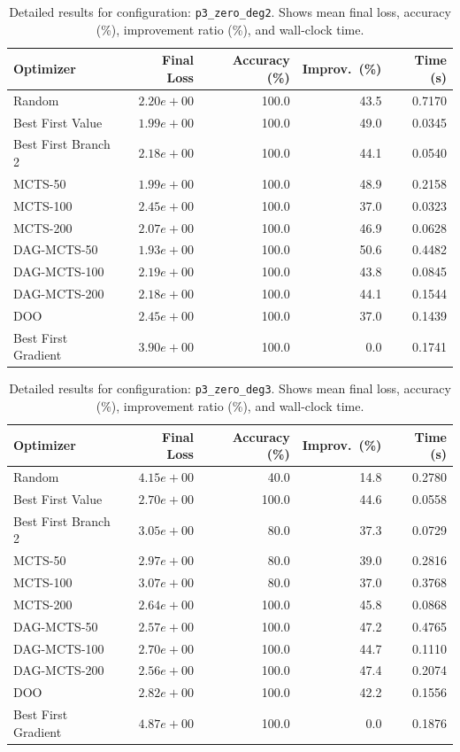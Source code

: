 \begin{table}[H]
\centering
\caption{Detailed results for configuration: \texttt{p3\_zero\_deg2}. Shows mean final loss, accuracy (\%), improvement ratio (\%), and wall-clock time.}
\label{tab:funclearn-detail-10}
\begin{tabular}{lrrrr}
\toprule
Optimizer & Final Loss & Accuracy (\%) & Improv.~(\%) & Time (s) \\
\midrule
Random & $2.20e+00$ & 100.0 & 43.5 & 0.7170 \\
\hline
Best First Value & $1.99e+00$ & 100.0 & 49.0 & 0.0345 \\
\hline
Best First Branch 2 & $2.18e+00$ & 100.0 & 44.1 & 0.0540 \\
\hline
MCTS-50 & $1.99e+00$ & 100.0 & 48.9 & 0.2158 \\
\hline
MCTS-100 & $2.45e+00$ & 100.0 & 37.0 & 0.0323 \\
\hline
MCTS-200 & $2.07e+00$ & 100.0 & 46.9 & 0.0628 \\
\hline
DAG-MCTS-50 & \textbf{$1.93e+00$} & 100.0 & 50.6 & 0.4482 \\
\hline
DAG-MCTS-100 & $2.19e+00$ & 100.0 & 43.8 & 0.0845 \\
\hline
DAG-MCTS-200 & $2.18e+00$ & 100.0 & 44.1 & 0.1544 \\
\hline
DOO & $2.45e+00$ & 100.0 & 37.0 & 0.1439 \\
\hline
Best First Gradient & $3.90e+00$ & 100.0 & 0.0 & 0.1741 \\
\bottomrule
\end{tabular}
\end{table}

\begin{table}[H]
\centering
\caption{Detailed results for configuration: \texttt{p3\_zero\_deg3}. Shows mean final loss, accuracy (\%), improvement ratio (\%), and wall-clock time.}
\label{tab:funclearn-detail-11}
\begin{tabular}{lrrrr}
\toprule
Optimizer & Final Loss & Accuracy (\%) & Improv.~(\%) & Time (s) \\
\midrule
Random & $4.15e+00$ & 40.0 & 14.8 & 0.2780 \\
\hline
Best First Value & $2.70e+00$ & 100.0 & 44.6 & 0.0558 \\
\hline
Best First Branch 2 & $3.05e+00$ & 80.0 & 37.3 & 0.0729 \\
\hline
MCTS-50 & $2.97e+00$ & 80.0 & 39.0 & 0.2816 \\
\hline
MCTS-100 & $3.07e+00$ & 80.0 & 37.0 & 0.3768 \\
\hline
MCTS-200 & $2.64e+00$ & 100.0 & 45.8 & 0.0868 \\
\hline
DAG-MCTS-50 & $2.57e+00$ & 100.0 & 47.2 & 0.4765 \\
\hline
DAG-MCTS-100 & $2.70e+00$ & 100.0 & 44.7 & 0.1110 \\
\hline
DAG-MCTS-200 & \textbf{$2.56e+00$} & 100.0 & 47.4 & 0.2074 \\
\hline
DOO & $2.82e+00$ & 100.0 & 42.2 & 0.1556 \\
\hline
Best First Gradient & $4.87e+00$ & 100.0 & 0.0 & 0.1876 \\
\bottomrule
\end{tabular}
\end{table}

